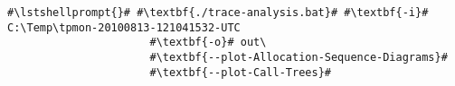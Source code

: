 \begin{lstlisting}[caption=Command to produce the diagrams under Windows,label=lst:traceAnalysis:sequenceDiagramWin]
#\lstshellprompt{}# #\textbf{./trace-analysis.bat}# #\textbf{-i}# C:\Temp\tpmon-20100813-121041532-UTC
                      #\textbf{-o}# out\
                      #\textbf{--plot-Allocation-Sequence-Diagrams}#
                      #\textbf{--plot-Call-Trees}#		
\end{lstlisting}